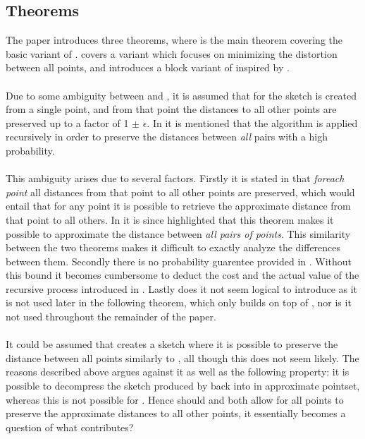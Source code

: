 \subsection{Theorems}
The paper introduces three theorems, where  is the main theorem covering the basic variant of \qs{}.  covers a variant which focuses on minimizing the distortion between all points, and  introduces a block variant of  inspired by \cite{schmid9}.
\\
\\
Due to some ambiguity between  and , it is assumed that for  the sketch is created from a single point, and from that point the distances to all other points are preserved up to a factor of 1 $\pm$ $\epsilon$. In  it is mentioned that the algorithm is applied recursively in order to preserve the distances between \textit{all} pairs with a high probability.
\\
\\
This ambiguity arises due to several factors. Firstly it is stated in  that \textit{foreach point} all distances from that point to all other points are preserved, which would entail that for any point it is possible to retrieve the approximate distance from that point to all others. In  it is since highlighted that this theorem makes it possible to approximate the distance between \textit{all pairs of points}. This similarity between the two theorems makes it difficult to exactly analyze the differences between them. Secondly there is no probability guarentee provided in . Without this bound it becomes cumbersome to deduct the cost and the actual value of the recursive process introduced in . Lastly does it not seem logical to introduce  as it is not used later in the following theorem, which only builds on top of , nor is it not used throughout the remainder of the paper. 
\\
\\
It could be assumed that  creates a sketch where it is possible to preserve the distance between all points similarly to , all though this does not seem likely. The reasons described above argues against it as well as the following property: it is possible to decompress the sketch produced by  back into in approximate pointset, whereas this is not possible for . Hence should  and  both allow for all points to preserve the approximate distances to all other points, it essentially becomes a question of what  contributes?
